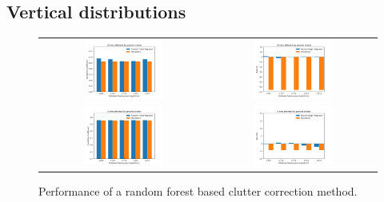 \documentclass{article}
\begin{document}
\subsection*{Vertical distributions}
\begin{center}
\begin{figure}
\begin{tabular}{cc}
    \includegraphics[width=0.495\textwidth]{Figs/corrCoeff_16bins.png}
    &
    \includegraphics[width=0.495\textwidth]{Figs/bias_16bins.png}\\

    \includegraphics[width=0.495\textwidth]{Figs/corrCoeff_04bins.png}
    &
    \includegraphics[width=0.495\textwidth]{Figs/bias_04bins.png}\\ 
\end{tabular}
\caption{Performance of a random forest based clutter correction method.}
\end{figure}
\end{center}
        


    
\end{document}
